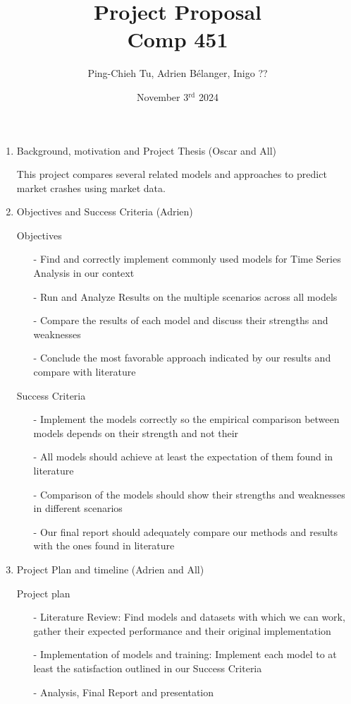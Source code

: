 \documentclass[12pt, letterpaper]{article}
\title{
  Project Proposal \\
  \Large Comp 451}
\author{Ping-Chieh Tu, Adrien Bélanger, Inigo ??}
\date{November 3$^{\text{rd}}$ 2024}
\begin{document}
\maketitle 

\begin{enumerate}
    \item Background, motivation and Project Thesis (Oscar and All)
    
    This project compares several related models and approaches to predict market crashes using market data.
    
    \item Objectives and Success Criteria (Adrien)
    
        Objectives
        \begin{itemize}
            \item[-] Find and correctly implement commonly used models for Time Series Analysis in our context
            \item[-] Run and Analyze Results on the multiple scenarios across all models
            \item[-] Compare the results of each model and discuss their strengths and weaknesses
            \item[-] Conclude the most favorable approach indicated by our results and compare with literature
        \end{itemize} 
        Success Criteria
        \begin{itemize}
            \item [-] Implement the models correctly so the empirical comparison between models depends on their strength and not their
            \item [-] All models should achieve at least the expectation of them found in literature
            \item [-] Comparison of the models should show their strengths and weaknesses in different scenarios
            \item [-] Our final report should adequately compare our methods and results with the ones found in literature
        \end{itemize}
        
    \item Project Plan and timeline (Adrien and All)
        
        Project plan
        \begin{itemize}
            \item [-] Literature Review: Find models and datasets with which we can work, gather their expected performance and their original implementation
            \item [-] Implementation of models and training: Implement each model to at least the satisfaction outlined in our Success Criteria
            \item [-] Analysis, Final Report and presentation
        \end{itemize}
    

\end{enumerate}
\end{document}

